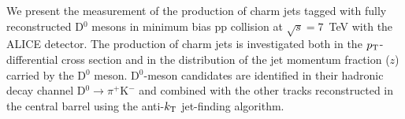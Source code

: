 \documentclass[12pt]{article}
\begin{document}
We present the measurement of the production of charm jets tagged with fully reconstructed D$^0$ mesons in minimum bias pp collision at $\sqrt{s} = 7$~TeV with the ALICE detector. 
The production of charm jets is investigated both in the $p_{\rm T}$-differential cross section and in the distribution of the jet momentum fraction ($z$) carried by the D$^0$ meson.
D$^0$-meson candidates are identified in their hadronic decay channel D$^0\rightarrow \pi^{+}$K$^{-}$ and combined with the other tracks reconstructed in the central barrel using the anti-$k_{\rm T}$ jet-finding algorithm.
\end{document}
